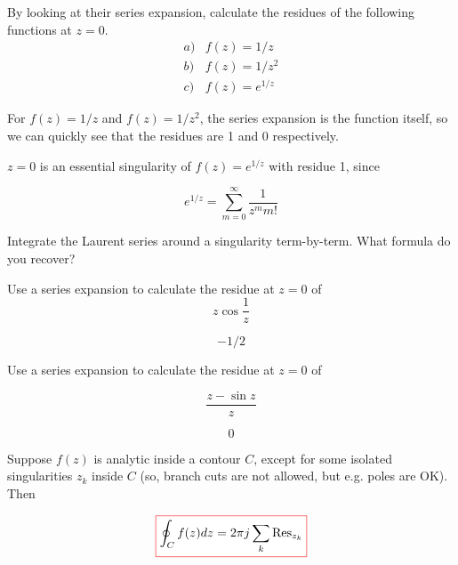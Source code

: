 \begin{cue}
  By looking at their series expansion, calculate the residues of the following functions at $z=0$.
  $$\begin{array}{lcll}a) & f(z)=1/z \\b) & f(z)=1/z^2 \\c) & f(z)=e^{1/z}\end{array}$$
\end{cue}

For $f(z)=1/z$ and $f(z)=1/z^2$, the series expansion is the function itself, so we can quickly see that the residues are 1 and 0 respectively.

$z=0$ is an essential singularity of $f(z)=e^{1/z}$ with residue 1, since

$$e^{1/z} = \sum_{m=0}^{\infty} \frac{1}{z^m m!} $$

\pagebreak 

\begin{exer}
  Integrate the Laurent series around a singularity term-by-term. What formula do you recover?
\end{exer}

\begin{exer}
  Use a series expansion to calculate the residue at $z=0$ of
  $$z \cos \frac{1}{z}$$
  \begin{sol}
    $$-1/2$$
  \end{sol}
\end{exer}

\begin{exer}
  Use a series expansion to calculate the residue at $z=0$ of

  $$\frac{z - \sin z}{z}$$
  \begin{sol}
    $$0$$
  \end{sol}
\end{exer}

\pagebreak


Suppose $f(z)$ is analytic inside a contour ${C}$, except for some isolated singularities $z_k$ inside ${C}$ (so, branch cuts are not allowed, but e.g. poles are OK). Then

\begin{equation}
\fbox{$\displaystyle
\oint_{{C}} f(z) dz = 2 \pi j \sum_k \mathrm{Res}_{z_k} \label{eq-res-theorem}
$}
\end{equation} 

